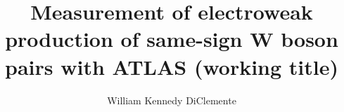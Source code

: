 
\title{Measurement of electroweak production of same-sign W boson pairs with ATLAS (working title)} 

\author{William Kennedy DiClemente}

\newcommand{\adviser}{I. Joseph Kroll, Professor, Physics}
\newcommand{\advisershort}{J. Kroll}

\newcommand{\myinstitution}{The University of Pennsylvania}

\newcommand{\chairperson}{Joshua Klein, Professor, Physics}

\newcommand{\committeeOne}{Elliot Lipeles, Associate Professor, Physics}
\newcommand{\committeeTwo}{Christopher Mauger, Associate Professor, Physics}
\newcommand{\committeeThree}{Burt Ovrut, Professor, Physics}
\newcommand{\committeeFour}{Justin Khoury, Professor, Physics}





